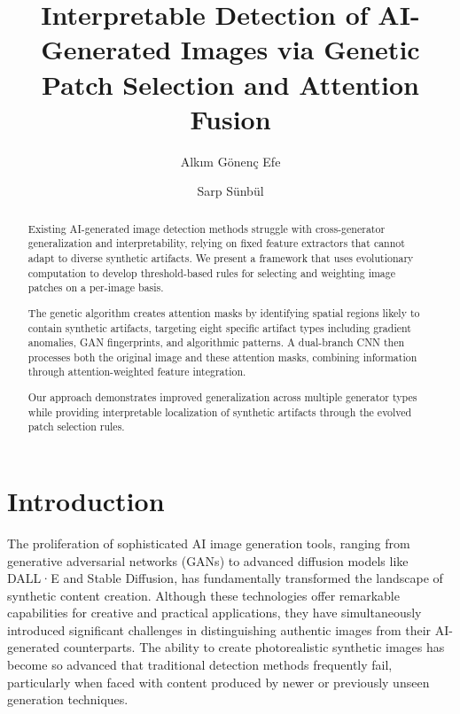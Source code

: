 \documentclass[runningheads]{llncs}
\begin{document}
%
\title{Interpretable Detection of AI-Generated Images via Genetic Patch Selection and Attention Fusion}
%
%

\author{Alkım Gönenç Efe \and Sarp Sünbül}
%
%

%
\maketitle              %
%
\begin{abstract}
Existing AI-generated image detection methods struggle with cross-generator generalization and interpretability, relying on fixed feature extractors that cannot adapt to diverse synthetic artifacts. We present a framework that uses evolutionary computation to develop threshold-based rules for selecting and weighting image patches on a per-image basis.

The genetic algorithm creates attention masks by identifying spatial regions likely to contain synthetic artifacts, targeting eight specific artifact types including gradient anomalies, GAN fingerprints, and algorithmic patterns. A dual-branch CNN then processes both the original image and these attention masks, combining information through attention-weighted feature integration.

Our approach demonstrates improved generalization across multiple generator types while providing interpretable localization of synthetic artifacts through the evolved patch selection rules.

\end{abstract}
%
%
%
\section{Introduction}

The proliferation of sophisticated AI image generation tools, ranging from generative adversarial networks (GANs) to advanced diffusion models like DALL·E and Stable Diffusion, has fundamentally transformed the landscape of synthetic content creation. Although these technologies offer remarkable capabilities for creative and practical applications, they have simultaneously introduced significant challenges in distinguishing authentic images from their AI-generated counterparts. The ability to create photorealistic synthetic images has become so advanced that traditional detection methods frequently fail, particularly when faced with content produced by newer or previously unseen generation techniques.
\end{document}
